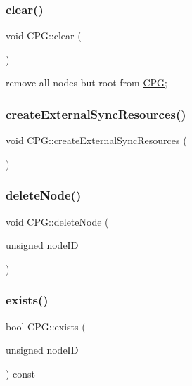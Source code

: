 \mbox{\label{classCPG_a7b9beb05a9681c34d99509018dda8739}} 
\subsubsection{\texorpdfstring{clear()}{clear()}}
{\footnotesize\ttfamily void C\+P\+G\+::clear (\begin{DoxyParamCaption}{ }\end{DoxyParamCaption})}



remove all nodes but root from \mbox{\hyperlink{classCPG}{C\+PG}}; 

\mbox{\label{classCPG_af934e459315109d3c206781bccef997b}} 
\subsubsection{\texorpdfstring{create\+External\+Sync\+Resources()}{createExternalSyncResources()}}
{\footnotesize\ttfamily void C\+P\+G\+::create\+External\+Sync\+Resources (\begin{DoxyParamCaption}{ }\end{DoxyParamCaption})}

\mbox{\label{classCPG_a4926078d71fc86b7cec29faa43b16d8e}} 
\subsubsection{\texorpdfstring{delete\+Node()}{deleteNode()}}
{\footnotesize\ttfamily void C\+P\+G\+::delete\+Node (\begin{DoxyParamCaption}\item[{unsigned}]{node\+ID }\end{DoxyParamCaption})}

\mbox{\label{classCPG_afa2ec0b75b84e9f089f82045d08dbb31}} 
\subsubsection{\texorpdfstring{exists()}{exists()}}
{\footnotesize\ttfamily bool C\+P\+G\+::exists (\begin{DoxyParamCaption}\item[{unsigned}]{node\+ID }\end{DoxyParamCaption}) const}

